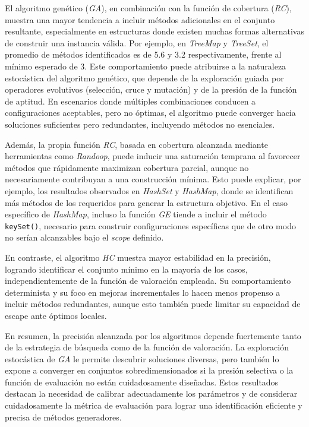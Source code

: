 El algoritmo genético (\emph{GA}), en combinación con la función de cobertura (\emph{RC}), muestra una mayor tendencia a incluir métodos 
adicionales en el conjunto resultante, especialmente en estructuras donde existen muchas formas alternativas de construir una instancia válida. 
Por ejemplo, en \emph{TreeMap} y \emph{TreeSet}, el promedio de métodos identificados es de 5.6 y 3.2 respectivamente, 
frente al mínimo esperado de 3. Este comportamiento puede atribuirse a la naturaleza estocástica del algoritmo genético,
que depende de la exploración guiada por operadores evolutivos (selección, cruce y mutación) y de la presión de la función de aptitud. 
En escenarios donde múltiples combinaciones conducen a configuraciones aceptables, pero no óptimas, el algoritmo puede converger 
hacia soluciones suficientes pero redundantes, incluyendo métodos no esenciales.

Además, la propia función \emph{RC}, basada en cobertura alcanzada mediante herramientas como \emph{Randoop}, 
puede inducir una saturación temprana al favorecer métodos que rápidamente maximizan cobertura parcial, 
aunque no necesariamente contribuyan a una construcción mínima. Esto puede explicar, por ejemplo, los resultados observados en \emph{HashSet} y \emph{HashMap}, 
donde se identifican más métodos de los requeridos para generar la estructura objetivo. 
En el caso específico de \emph{HashMap}, incluso la función \emph{GE} tiende a incluir el método \texttt{keySet()}, 
necesario para construir configuraciones específicas que de otro modo no serían alcanzables bajo el \emph{scope} definido.

En contraste, el algoritmo \emph{HC} muestra mayor estabilidad en la precisión, 
logrando identificar el conjunto mínimo en la mayoría de los casos, 
independientemente de la función de valoración empleada. Su comportamiento determinista y 
su foco en mejoras incrementales lo hacen menos propenso a incluir métodos redundantes, 
aunque esto también puede limitar su capacidad de escape ante óptimos locales.

En resumen, la precisión alcanzada por los algoritmos depende fuertemente tanto de la estrategia de búsqueda como de la función de valoración. 
La exploración estocástica de \emph{GA} le permite descubrir soluciones diversas, 
pero también lo expone a converger en conjuntos sobredimensionados si la presión selectiva o la función de evaluación no están cuidadosamente diseñadas. 
Estos resultados destacan la necesidad de calibrar adecuadamente los parámetros y de considerar cuidadosamente la métrica de evaluación para lograr una identificación eficiente y precisa de métodos generadores.


